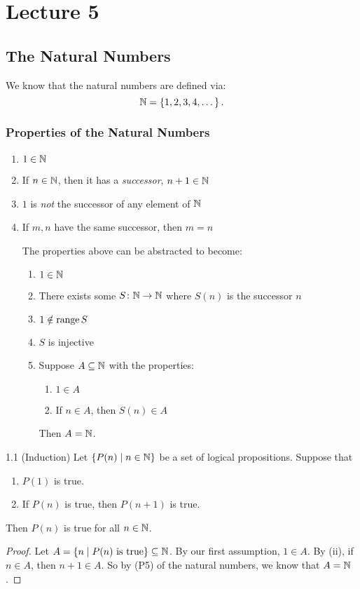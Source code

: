 \documentclass[class=article, crop=false]{standalone}
\begin{document}
  \section{Lecture 5}
  \subsection{The Natural Numbers}
  We know that the natural numbers are defined via:
  \[
    \mathbb{N} = \left\{1, 2, 3, 4, \dotsc\right\}.
  \]
  \subsubsection{Properties of the Natural Numbers}
  \begin{enumerate}[label=(P\arabic*)]
    \item $1\in\mathbb{N}$
    \item If $n\in \mathbb{N}$, then it has a \emph{successor}, $n + 1\in\mathbb{N}$
    \item $1$ is \emph{not} the successor of any element of $\mathbb{N}$
    \item If $m, n$ have the same successor, then $m = n$
    \begin{note}{}
      The properties above can be abstracted to become:
      \begin{enumerate}[label=(P\arabic*)]
        \item $1\in \mathbb{N}$
        \item There exists some $S\colon \mathbb{N}\to \mathbb{N}$ where $S(n)$ is the successor $n$
        \item $1\notin \operatorname{range} S$
        \item $S$ is injective
        \item Suppose $A\subseteq \mathbb{N}$ with the properties:
        \begin{enumerate}[label=(\roman*)]
          \item $1\in A$
          \item If $n\in A$, then $S(n)\in A$
        \end{enumerate}
        Then $A = \mathbb{N}$.
      \end{enumerate}
    \end{note}
  \end{enumerate}
  \begin{theorem}{1.1 (Induction)}
    Let $\left\{P(n)\mid n\in\mathbb{N}\right\}$ be a set of logical propositions. Suppose that
    \begin{enumerate}[label=(\roman*)]
      \item $P(1)$ is true.
      \item If $P(n)$ is true, then $P(n + 1)$ is true.
    \end{enumerate}
    Then $P(n)$ is true for all $n\in\mathbb{N}$.
    \begin{proof}
      Let $A = \left\{n\mid P(n) \text{ is true}\right\}\subseteq\mathbb{N}$. By our first assumption, $1\in A$. By (ii), if $n\in A$, then $n + 1\in A$. So by (P5) of the natural numbers, we know that $A = \mathbb{N}$.
    \end{proof}
  \end{theorem}
\end{document}
